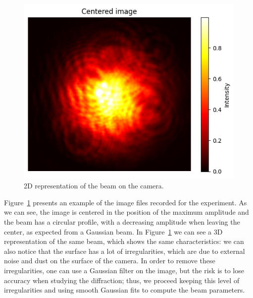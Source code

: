 \documentclass[prl,twocolumn]{revtex4-1}
\begin{document}
\begin{figure}[!t]
    \centering
    \includegraphics[width=1\linewidth]{Images/centered_example.png}
    \caption{2D representation of the beam on the camera.}
    \label{fig:centered_example}
\end{figure}

Figure~\ref{fig:centered_example} presents an example of the image files recorded for the experiment. As we can see, the image is centered in the position of the maximum amplitude and the beam has a circular profile, with a decreasing amplitude when leaving the center, as expected from a Gaussian beam. In Figure~\ref{fig:centered_example} we can see a 3D representation of the same beam, which shows the same characteristics: we can also notice that the surface has a lot of irregularities, which are due to external noise and dust on the surface of the camera. In order to remove these irregularities, one can use a Gaussian filter on the image, but the risk is to lose accuracy when studying the diffraction; thus, we proceed keeping this level of irregularities and using smooth Gaussian fits to compute the beam parameters.
\end{document}

